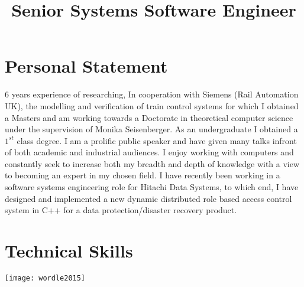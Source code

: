 \documentclass[11pt,a4paper,sans]{moderncv}
\title{Senior Systems Software Engineer}
\begin{document}
\makecvtitle

\section{Personal Statement}
6 years experience of researching, In cooperation with Siemens (Rail Automation UK), the modelling and verification of train control systems for which I obtained a Masters and am working towards a Doctorate in theoretical computer science under the supervision of Monika Seisenberger. As an undergraduate I obtained a $1^{st}$ class degree. I am a prolific public speaker and have given many talks infront of both academic and industrial audiences. I enjoy working with computers and constantly seek to increase both my breadth and depth of knowledge with a view to becoming an expert in my chosen field. I have recently been working in a software systems engineering role for Hitachi Data Systems, to which end, I have designed and implemented a new dynamic distributed role based access control system in C++ for a data protection/disaster recovery product.


\section{Technical Skills}
\begin{center}
\texttt{[image: wordle2015]}
\end{center}
\end{document}
